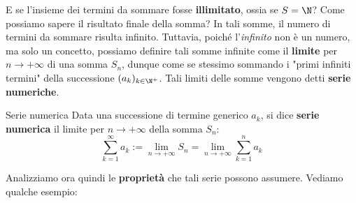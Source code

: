 \documentclass[a4paper, 12pt]{report}
\begin{document}
    E se l'insieme dei termini da sommare fosse \textbf{illimitato}, ossia se $S = \N$? Come possiamo sapere il risultato finale della somma? In tali somme, il numero di termini da sommare risulta infinito. Tuttavia, poiché l'\textit{infinito} non è un numero, ma solo un concetto, possiamo definire tali somme infinite come il \textbf{limite} per $n \to +\infty$ di una somma $S_n$, dunque come se stessimo sommando i "primi infiniti termini" della successione $(a_k)_{k \in \N^+}$. Tali limiti delle somme vengono detti \textbf{serie numeriche}.
    
    \begin{frameddefn}{Serie numerica}
        Data una successione di termine generico $a_k$, si dice \textbf{serie numerica} il limite per $n \to +\infty$ della somma $S_n$:
        \[ \sum_{k = 1}^{\infty} a_k := \lim_{n \to +\infty} S_n = \lim_{n \to +\infty} \sum_{k = 1}^{n} a_k\]
    \end{frameddefn}

    Analizziamo ora quindi le \textbf{proprietà} che tali serie possono assumere. Vediamo qualche esempio:
    
\end{document}
